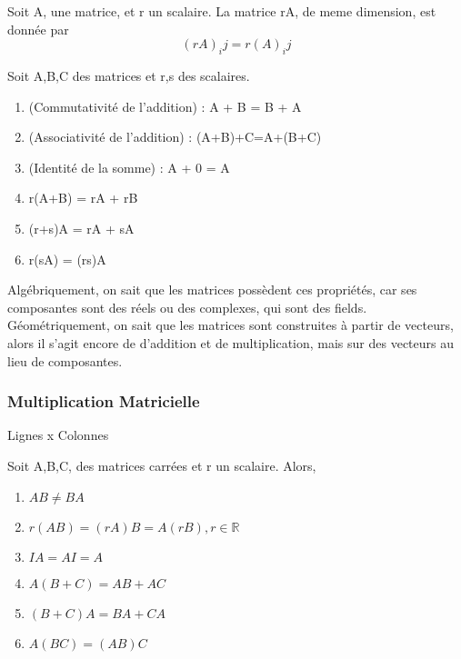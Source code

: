\documentclass{article}
\begin{document}
\begin{defintion}
    Soit A, une matrice, et r un scalaire. La matrice rA, de meme dimension,
    est donnée par $$ (rA)_ij = r(A)_ij$$
\end{defintion}

\begin{remark}

\end{remark}

\begin{theorem}
    Soit A,B,C des matrices et r,s des scalaires.
    \begin{enumerate}
	\item (Commutativité de l'addition) : A + B = B + A
	\item (Associativité de l'addition) : (A+B)+C=A+(B+C)
	\item (Identité de la somme) : A + 0 = A
	\item r(A+B) = rA + rB
	\item (r+s)A = rA + sA
	\item r(sA) = (rs)A
    \end{enumerate}
\end{theorem}

\begin{remark}
    Algébriquement, on sait que les matrices possèdent ces propriétés,
    car ses composantes sont des réels ou des complexes, qui sont
    des fields. Géométriquement, on sait que les matrices sont construites
    à partir de vecteurs, alors il s'agit encore de d'addition et de
    multiplication, mais sur des vecteurs au lieu de composantes.
\end{remark}

\subsubsection{Multiplication Matricielle}

\begin{definition}
    Lignes x Colonnes
\end{definition}

\begin{theorem}
    Soit A,B,C, des matrices carrées et r un scalaire. Alors,
    \begin{enumerate}
	\item $ AB \neq BA$
	\item $ r(AB) = (rA)B = A(rB), r \in \mathbb{R}$
	\item $ IA = AI = A$
	\item $A(B+C) = AB + AC$
	\item $(B+C)A=BA + CA$
	\item $A(BC) = (AB)C$
    \end{enumerate}
\end{theorem}
\end{document}
